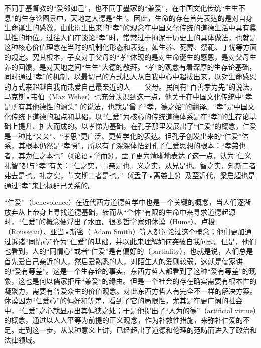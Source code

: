\documentclass[UTF8, 12pt, a4paper]{ctexrep}
\begin{document}
不同于基督教的“爱邻如己”，也不同于墨家的“兼爱”，在中国文化传统“生生不息”的生存论图景中，天地之大德是“生”。因此，生命的存在首先表达的是对自身生命诞生的感激，由此衍生出来的“孝”的观念在中国文化传统的道德生活中具有奠基性的地位。过往人们在谈论“孝”时，常常过于拘泥于历史上的具体做法，也就是这种核心价值理念在当时的机制化形态和表达，如生养、死葬、祭祀、丁忧等方面的规定。究其根本，子女对于父母的“孝”体现的是对生命诞生的感恩，是对父母生养的回馈，是对天地之间“生生”大德的敬拜。“孝”的观念有着深厚的生存论基础，同时通过“孝”的机制，以最切己的方式把人从自我中心中超拔出来，以对生命感恩的方式来超越自我而热爱自己最亲近的人——父母。民间有“百善孝为先”的说法，马克斯•韦伯（Max Weber）也充分认识到这一点，他关于在中国文化传统中“孝是所有其他德性的源头” 的说法，也就是曾子“孝，德之始”的翻译。“孝”是中国文化传统下道德的起点和基础，以“仁爱”为核心的传统道德体系是在“孝”的生存论基础上提升、扩大而成的。以孝悌为基础，在孔子那里发展出了“仁爱”的概念，仁爱是一种比“亲亲”、“孝思”更广泛、更哲学化的表达。但孔子创发出来的“仁爱”体系，其根本仍然是“孝悌”，所以有子深深体悟到孔子仁爱思想的根本：“孝弟也者，其为仁之本也”（《论语•学而》）。孟子更为清晰地表达了这一点，认为“仁义礼智”都与“孝”有关：“仁之实，事亲是也。义之实，从兄是也。智之实，知斯二者弗去是也。礼之实，节文斯二者是也。”（《孟子•离娄上》）及至近代，梁启超也是通过“孝”来比拟群己关系的。

“仁爱”（benevolence）在近代西方道德哲学中也是一个关键的概念，当人们逐渐放弃从上帝身上寻找道德基础，转而从“个体”有限的生命中来寻求道德起源时，“仁爱”的概念便浮出了水面。很多哲学家如休谟（Hume）、卢梭（Rousseau）、亚当•斯密（ Adam Smith）等人都讨论过这个概念；他们更加通过诉诸“同情心”作为“仁爱”的基础，并以此来理解如何突破自我问题。但是，他们也看到，人的“同情心”或者“仁爱”是有偏好的（partiality），也就是说，人们总是首先爱自己亲近的人，然后爱熟悉的人，对陌生人的爱则较弱，这就是儒家讲的“爱有等差”。这是一个生存论的事实，东西方哲人都看到了这种“爱有等差”的现象，这也是何以儒家拒斥“兼爱”的缘由。但是一个社会的存在确实需要有根本性的凝聚力，需要有普爱众生的价值观念。对此东西方哲人有完全不一样的解决方案。休谟因为“仁爱心”的偏好和等差，看到了它的局限性，尤其是在更广阔的社会中，“仁爱”之心就显示出其偏狭之处；于是他提出了“人为的德”（artificial virtue）的概念，通过以人人平等为前提的正义观念，作为补救性措施，来弥补仁爱的不足。走到这一步，从某种意义上讲，已经超出了道德和伦理的范畴而进入了政治和法律领域。
\end{document}
